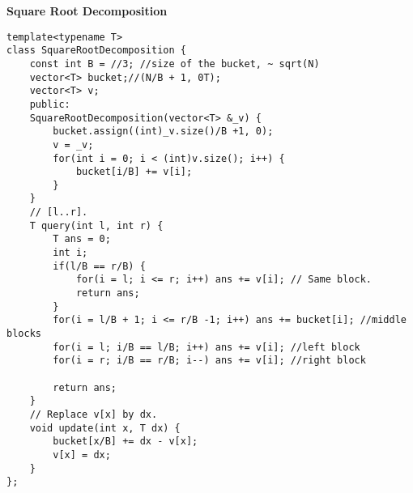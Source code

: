 \documentclass[a4paper,10pt]{article}
\newcommand{\titleAlg}[1]{\vspace{-10pt}
\begin{center}\textbf{#1}\end{center} \vspace{-10pt}}
\begin{document}
\titleAlg{Square Root Decomposition}
\begin{multicols}{2}
\begin{verbatim}
template<typename T>
class SquareRootDecomposition {
    const int B = //3; //size of the bucket, ~ sqrt(N)
    vector<T> bucket;//(N/B + 1, 0T);
    vector<T> v;
    public:
    SquareRootDecomposition(vector<T> &_v) {
        bucket.assign((int)_v.size()/B +1, 0);
        v = _v;
        for(int i = 0; i < (int)v.size(); i++) {
            bucket[i/B] += v[i];
        }
    }
    // [l..r].
    T query(int l, int r) {
        T ans = 0;
        int i;
        if(l/B == r/B) {
            for(i = l; i <= r; i++) ans += v[i]; // Same block.
            return ans;
        }
        for(i = l/B + 1; i <= r/B -1; i++) ans += bucket[i]; //middle blocks
        for(i = l; i/B == l/B; i++) ans += v[i]; //left block
        for(i = r; i/B == r/B; i--) ans += v[i]; //right block

        return ans;
    }
    // Replace v[x] by dx.
    void update(int x, T dx) {
        bucket[x/B] += dx - v[x];
        v[x] = dx;
    }
};
\end{verbatim}
\end{multicols}
\end{document}
